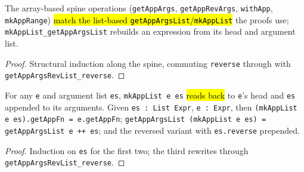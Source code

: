 \begin{lemma}
\label{family:expr-spine}
\leanok
{} The array-based spine operations (\texttt{getAppArgs}, \texttt{getAppRevArgs}, \texttt{withApp}, \texttt{mkAppRange}) \hl{match the list-based \texttt{getAppArgsList}/\texttt{mkAppList}} the proofs use; \texttt{mkAppList\_getAppArgsList} rebuilds an expression from its head and argument list.
\end{lemma}
\begin{proof}
\leanok
{} Structural induction along the spine, commuting \texttt{reverse} through with \texttt{getAppArgsRevList\_reverse}.
\end{proof}

\begin{theorem}
\label{thm:mkapplist-spine}
\leanok
{} 

 For any \texttt{e} and argument list \texttt{es}, \texttt{mkAppList e es} \hl{reads back} to \texttt{e}'s head and \texttt{es} appended to its arguments. Given \texttt{es : List Expr}, \texttt{e : Expr}, then \texttt{(mkAppList e es).getAppFn = e.getAppFn}; \texttt{getAppArgsList (mkAppList e es) = getAppArgsList e ++ es}; and the reversed variant with \texttt{es.reverse} prepended.
\end{theorem}
\begin{proof}
\leanok
{} Induction on \texttt{es} for the first two; the third rewrites through \texttt{getAppArgsRevList\_reverse}.
\end{proof}

